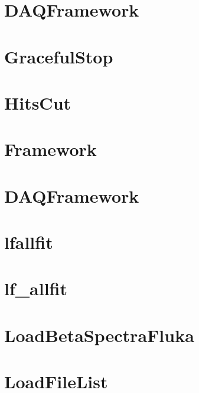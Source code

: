 \let\mypdfximage\pdfximage\def\pdfximage{\immediate\mypdfximage}\documentclass[twoside]{book}
\newcommand{\+}{\discretionary{\mbox{\scriptsize$\hookleftarrow$}}{}{}}
\begin{document}
\chapter{DAQFramework}
\label{md_UserTools_FlagAFTs_README}

\chapter{Graceful\+Stop}
\label{md_UserTools_GracefulStop_README}

\chapter{Hits\+Cut}
\label{md_UserTools_IDHitsCut_README}

\chapter{Framework}
\label{md_UserTools_ImportedTools_README}

\chapter{DAQFramework}
\label{md_UserTools_InactiveTools_README}

\chapter{lfallfit}
\label{md_UserTools_lfallfit_README}

\chapter{lf\+\_\+allfit}
\label{md_UserTools_lfallfit_simple_README}

\chapter{Load\+Beta\+Spectra\+Fluka}
\label{md_UserTools_LoadBetaSpectraFluka_README}

\chapter{Load\+File\+List}
\label{md_UserTools_LoadFileList_README}

\end{document}
